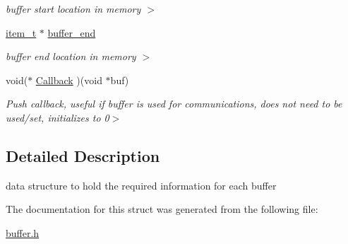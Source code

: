 \begin{DoxyCompactItemize}
\begin{DoxyCompactList}\small\item\em buffer start location in memory $>$ \end{DoxyCompactList}\item 
\hypertarget{structbuffer__t_a8e8e7bbc56528dd803ba71c1a84b8d8b}{\hyperlink{group__buffer_gad9732dcc12e8aa91d552188c72dea329}{item\+\_\+t} $\ast$ \hyperlink{structbuffer__t_a8e8e7bbc56528dd803ba71c1a84b8d8b}{buffer\+\_\+end}}\label{structbuffer__t_a8e8e7bbc56528dd803ba71c1a84b8d8b}

\begin{DoxyCompactList}\small\item\em buffer end location in memory $>$ \end{DoxyCompactList}\item 
\hypertarget{structbuffer__t_a7dbcb74a8bfc7196448f86c0c0155751}{void($\ast$ \hyperlink{structbuffer__t_a7dbcb74a8bfc7196448f86c0c0155751}{Callback} )(void $\ast$buf)}\label{structbuffer__t_a7dbcb74a8bfc7196448f86c0c0155751}

\begin{DoxyCompactList}\small\item\em Push callback, useful if buffer is used for communications, does not need to be used/set, initializes to 0$>$ \end{DoxyCompactList}\end{DoxyCompactItemize}


\subsection{Detailed Description}
data structure to hold the required information for each buffer 

The documentation for this struct was generated from the following file\+:\begin{DoxyCompactItemize}
\item 
\hyperlink{buffer_8h}{buffer.\+h}\end{DoxyCompactItemize}
